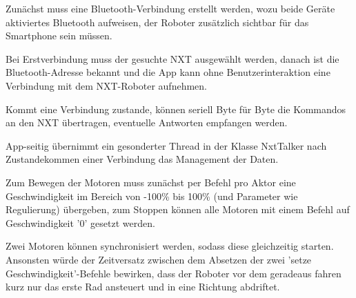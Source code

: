 Zunächst muss eine Bluetooth-Verbindung erstellt werden, wozu beide Geräte aktiviertes Bluetooth aufweisen, der Roboter zusätzlich sichtbar für das Smartphone sein müssen.

Bei Erstverbindung muss der gesuchte NXT ausgewählt werden, danach ist die Bluetooth-Adresse bekannt und die App kann ohne Benutzerinteraktion eine Verbindung mit dem NXT-Roboter aufnehmen.

Kommt eine Verbindung zustande, können seriell Byte für Byte die Kommandos an den NXT übertragen, eventuelle Antworten empfangen werden.

App-seitig übernimmt ein gesonderter Thread in der Klasse NxtTalker nach Zustandekommen einer Verbindung das Management der Daten.

Zum Bewegen der Motoren muss zunächst per Befehl pro Aktor eine Geschwindigkeit im Bereich von -100\% bis 100\% (und Parameter wie Regulierung) übergeben, zum Stoppen können alle Motoren mit einem Befehl auf Geschwindigkeit '0' gesetzt werden.

Zwei Motoren können synchronisiert werden, sodass diese gleichzeitig starten. Ansonsten würde der Zeitversatz zwischen dem Absetzen der zwei 'setze Geschwindigkeit'-Befehle bewirken, dass der Roboter vor dem geradeaus fahren kurz nur das erste Rad ansteuert und in eine Richtung abdriftet.


